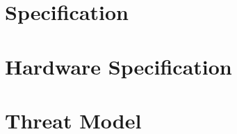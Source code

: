 \appendix
\newpage
\section{Specification}



\section{Hardware Specification}
\label{sec:hardware-spec}



\section{Threat Model}
\label{sec:threat-model-appendix}
